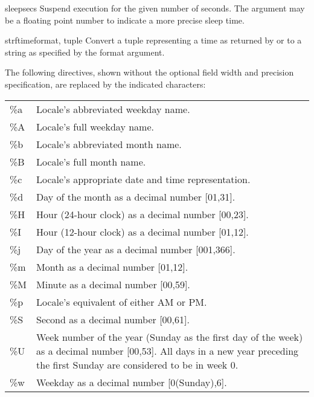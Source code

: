\begin{funcdesc}{sleep}{secs}
Suspend execution for the given number of seconds.  The argument may
be a floating point number to indicate a more precise sleep time.
\end{funcdesc}

\begin{funcdesc}{strftime}{format, tuple}
Convert a tuple representing a time as returned by  or
 to a string as specified by the format argument.

      The following directives, shown without the optional field width and
      precision specification, are replaced by the indicated characters:

\begin{tabular}{lp{25em}}
           \%a  &      Locale's abbreviated weekday name. \\
           \%A  &      Locale's full weekday name. \\
           \%b  &      Locale's abbreviated month name. \\
           \%B  &      Locale's full month name. \\
           \%c  &      Locale's appropriate date and time representation. \\
           \%d  &      Day of the month as a decimal number [01,31]. \\
           \%H  &      Hour (24-hour clock) as a decimal number [00,23]. \\
           \%I  &      Hour (12-hour clock) as a decimal number [01,12]. \\
           \%j  &      Day of the year as a decimal number [001,366]. \\
           \%m  &      Month as a decimal number [01,12]. \\
           \%M  &      Minute as a decimal number [00,59]. \\
           \%p  &      Locale's equivalent of either AM or PM. \\
           \%S  &      Second as a decimal number [00,61]. \\
           \%U  &      Week number of the year (Sunday as the first day of the
                     week) as a decimal number [00,53].  All days in a new
                     year preceding the first Sunday are considered to be in
                     week 0. \\
           \%w  &      Weekday as a decimal number [0(Sunday),6]. \\

\end{tabular}
\end{funcdesc}
